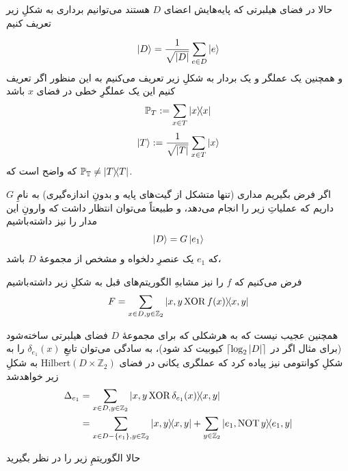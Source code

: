 \documentclass[a4paper,12pt]{article}
\DeclareMathOperator{\XOR}{XOR}
\DeclareMathOperator{\NOT}{NOT}
\begin{document}
حالا در فضای هیلبرتی که پایه‌هایش اعضای $D$ هستند می‌توانیم برداری به شکلِ زیر تعریف کنیم

\begin{equation}
    \ket{D} = \frac{1}{\sqrt{\abs{D}}} \sum_{e \in D} \ket{e}
\end{equation}
و همچنین یک عملگر و یک بردار به شکلِ زیر تعریف می‌کنیم
به این منظور اگر تعریف کنیم این یک عملگرِ خطی در فضای $x$ باشد
\begin{equation}
    \mathbb{P}_T := \sum_{x \in T} \dyad{x} 
\end{equation}
\begin{equation}
    \ket{T} :=  \frac{1}{\sqrt{\abs{T}}} \sum_{x \in T} \ket{x}
\end{equation}
که واضح است که 
$\mathbb{P_T} \ne \dyad{T}$.

اگر فرض بگیریم مداری (تنها متشکل از گیت‌های پایه و بدونِ اندازه‌گیری) به نامِ $G$ داریم که عملیاتِ زیر را انجام می‌دهد، و طبیعتاً می‌توان انتظار داشت که وارونِ این مدار را نیز داشته‌باشیم
\begin{equation}
    \ket{D} = G\ket{e_1}
\end{equation}
که $e_1$ یک عنصرِ دلخواه و مشخص از مجموعهٔ $D$ باشد،

فرض می‌کنیم که $f$ را نیز مشابهِ الگوریتم‌های قبل به شکلِ زیر داشته‌باشیم
\begin{equation}
    F = \sum_{x \in D, y \in \mathbb{Z}_2} \dyad{x, y \XOR f(x)}{x, y}
\end{equation}

همچنین عجیب نیست که به هرشکلی که برای مجموعهٔ $D$ فضای هیلبرتی ساخته‌شود (برای مثال اگر در 
$\lceil \log_2 \abs{D} \rceil$
 کیوبیت کد شود)، به سادگی می‌توان تابعِ $\delta_{e_1}(x)$ را به شکلِ کوانتومی نیز پیاده کرد که عملگری یکانی در فضای 
 $\mathrm{Hilbert}(D \times \mathbb{Z}_2)$
 به شکلِ زیر خواهدشد
\begin{align}
    \Delta_{e_1} &= \sum_{x \in D, y \in \mathbb{Z}_2} \dyad{x, y \XOR \delta_{e_1}(x)}{x, y} \\
    &= \sum_{x \in D - \{e_1\}, y \in \mathbb{Z}_2} \dyad{x, y} + \sum_{y \in \mathbb{Z}_2} \dyad{e_1, \NOT y}{e_1, y}
\end{align}

حالا الگوریتمِ زیر را در نظر بگیرید
\end{document}
